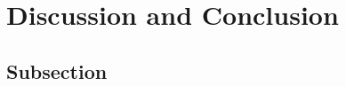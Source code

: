\documentclass[]{article}
\begin{document}
\section{Discussion and Conclusion} \label{sec:conclusion}



\subsection{Subsection} \label{sec:subsection}



\end{document}

